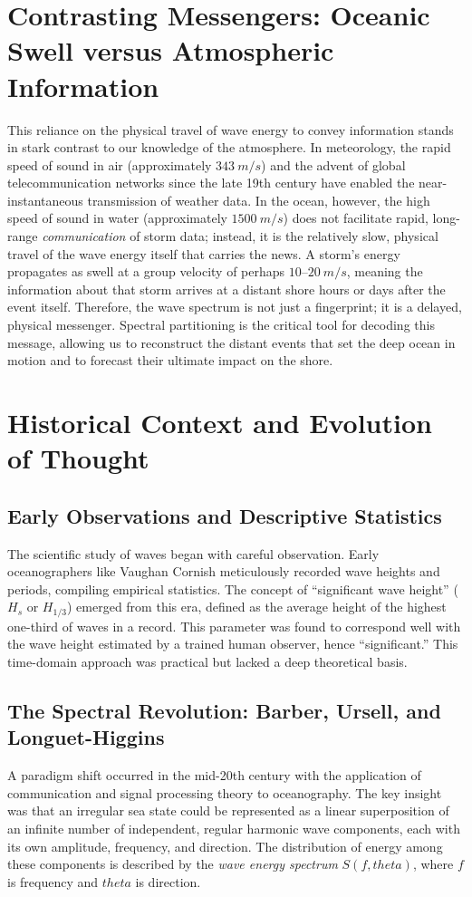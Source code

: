 \documentclass[journal,10pt,twocolumn]{IEEEtran}
\def\theta{theta}%
\def\text#1{#1}%
\begin{document}
    \section{Contrasting Messengers: Oceanic Swell versus Atmospheric Information}

    This reliance on the physical travel of wave energy to convey information stands in stark contrast to our knowledge of the atmosphere. In meteorology, the rapid speed of sound in air (approximately $343\ \text{m/s}$) and the advent of global telecommunication networks since the late 19th century have enabled the near-instantaneous transmission of weather data. In the ocean, however, the high speed of sound in water (approximately $1500\ \text{m/s}$) does not facilitate rapid, long-range \textit{communication} of storm data; instead, it is the relatively slow, physical travel of the wave energy itself that carries the news. A storm's energy propagates as swell at a group velocity of perhaps $10$--$20\ \text{m/s}$, meaning the information about that storm arrives at a distant shore hours or days after the event itself. Therefore, the wave spectrum is not just a fingerprint; it is a delayed, physical messenger. Spectral partitioning is the critical tool for decoding this message, allowing us to reconstruct the distant events that set the deep ocean in motion and to forecast their ultimate impact on the shore.

    \section{Historical Context and Evolution of Thought}

    \subsection{Early Observations and Descriptive Statistics}
    The scientific study of waves began with careful observation. Early oceanographers like Vaughan Cornish meticulously recorded wave heights and periods, compiling empirical statistics. The concept of ``significant wave height'' ($H_s$ or $H_{1/3}$) emerged from this era, defined as the average height of the highest one-third of waves in a record. This parameter was found to correspond well with the wave height estimated by a trained human observer, hence ``significant.'' This time-domain approach was practical but lacked a deep theoretical basis.

    \subsection{The Spectral Revolution: Barber, Ursell, and Longuet-Higgins}
    A paradigm shift occurred in the mid-20th century with the application of communication and signal processing theory to oceanography. The key insight was that an irregular sea state could be represented as a linear superposition of an infinite number of independent, regular harmonic wave components, each with its own amplitude, frequency, and direction. The distribution of energy among these components is described by the \textit{wave energy spectrum} $S(f,\theta)$, where $f$ is frequency and $\theta$ is direction.
\end{document}
